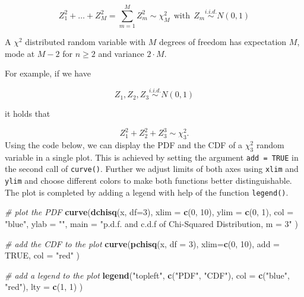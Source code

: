 \documentclass[]{book}
\newenvironment{Shaded}{\begin{snugshade}}{\end{snugshade}}
\newcommand{\KeywordTok}[1]{\textcolor[rgb]{0.13,0.29,0.53}{\textbf{#1}}}
\newcommand{\DataTypeTok}[1]{\textcolor[rgb]{0.13,0.29,0.53}{#1}}
\newcommand{\DecValTok}[1]{\textcolor[rgb]{0.00,0.00,0.81}{#1}}
\newcommand{\StringTok}[1]{\textcolor[rgb]{0.31,0.60,0.02}{#1}}
\newcommand{\CommentTok}[1]{\textcolor[rgb]{0.56,0.35,0.01}{\textit{#1}}}
\newcommand{\OtherTok}[1]{\textcolor[rgb]{0.56,0.35,0.01}{#1}}
\newcommand{\NormalTok}[1]{#1}
\theoremstyle{definition}
\theoremstyle{definition}
\theoremstyle{definition}
\theoremstyle{remark}
\begin{document}
\[ Z_1^2 + \dots + Z_M^2 = \sum_{m=1}^M Z_m^2 \sim \chi^2_M \ \ \text{with} \ \ Z_m \overset{i.i.d.}{\sim} N(0,1) \label{eq:chisq}\]

A \(\chi^2\) distributed random variable with \(M\) degrees of freedom
has expectation \(M\), mode at \(M-2\) for \(n \geq 2\) and variance
\(2 \cdot M\).

For example, if we have

\[ Z_1,Z_2,Z_3 \overset{i.i.d.}{\sim} N(0,1) \]

it holds that

\[ Z_1^2+Z_2^2+Z_3^3 \sim \chi^2_3. \tag{2.3} \] Using the code below,
we can display the PDF and the CDF of a \(\chi^2_3\) random variable in
a single plot. This is achieved by setting the argument
\texttt{add = TRUE} in the second call of \texttt{curve()}. Further we
adjust limits of both axes using \texttt{xlim} and \texttt{ylim} and
choose different colors to make both functions better distinguishable.
The plot is completed by adding a legend with help of the function
\texttt{legend()}.

\begin{Shaded}
\begin{Highlighting}[]
\CommentTok{# plot the PDF}
\KeywordTok{curve}\NormalTok{(}\KeywordTok{dchisq}\NormalTok{(x, }\DataTypeTok{df=}\DecValTok{3}\NormalTok{), }
      \DataTypeTok{xlim =} \KeywordTok{c}\NormalTok{(}\DecValTok{0}\NormalTok{, }\DecValTok{10}\NormalTok{), }
      \DataTypeTok{ylim =} \KeywordTok{c}\NormalTok{(}\DecValTok{0}\NormalTok{, }\DecValTok{1}\NormalTok{), }
      \DataTypeTok{col =} \StringTok{"blue"}\NormalTok{,}
      \DataTypeTok{ylab =} \StringTok{""}\NormalTok{,}
      \DataTypeTok{main =} \StringTok{"p.d.f. and c.d.f of Chi-Squared Distribution, m = 3"}
\NormalTok{      )}

\CommentTok{# add the CDF to the plot}
\KeywordTok{curve}\NormalTok{(}\KeywordTok{pchisq}\NormalTok{(x, }\DataTypeTok{df =} \DecValTok{3}\NormalTok{), }
      \DataTypeTok{xlim=}\KeywordTok{c}\NormalTok{(}\DecValTok{0}\NormalTok{, }\DecValTok{10}\NormalTok{), }
      \DataTypeTok{add =} \OtherTok{TRUE}\NormalTok{, }
      \DataTypeTok{col =} \StringTok{"red"}
\NormalTok{      )}

\CommentTok{# add a legend to the plot}
\KeywordTok{legend}\NormalTok{(}\StringTok{"topleft"}\NormalTok{, }
       \KeywordTok{c}\NormalTok{(}\StringTok{"PDF"}\NormalTok{, }\StringTok{"CDF"}\NormalTok{), }
       \DataTypeTok{col =} \KeywordTok{c}\NormalTok{(}\StringTok{"blue"}\NormalTok{, }\StringTok{"red"}\NormalTok{), }
       \DataTypeTok{lty =} \KeywordTok{c}\NormalTok{(}\DecValTok{1}\NormalTok{, }\DecValTok{1}\NormalTok{)}
\NormalTok{       )}
\end{Highlighting}
\end{Shaded}
\end{document}
